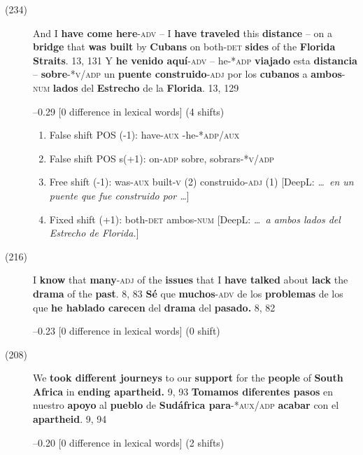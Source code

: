 \documentclass[output=paper]{langsci/langscibook}
\begin{document}
\begin{description}
  \item[(234)] And I \textbf{have come here}\textsc{-adv} -- I \textbf{have traveled} this \textbf{distance} -- on a \textbf{bridge} that \textbf{was built} by \textbf{Cubans} on both\textsc{-det} \textbf{sides} of the \textbf{Florida Straits}. 13, 131 \rightarrow Y \textbf{he venido aquí}\textsc{-adv} -- he\textsc{-*adp} \textbf{viajado} esta \textbf{distancia} -- \textbf{sobre}\textsc{-*v/adp} un \textbf{puente construido}\textsc{-adj} por los \textbf{cubanos} a \textbf{ambos}\textsc{-num} \textbf{lados} del \textbf{Estrecho} de la \textbf{Florida}. 13, 129

    --0.29 [0 difference in lexical words] (4 shifts)
    
    \begin{enumerate}
      \item False shift POS (-1): have\textsc{-aux} \rightarrow -he\textsc{-*adp/aux}
      \item False shift POS s(+1): on\textsc{-adp} \rightarrow sobre, sobrars\textsc{-*v/adp}
      \item Free shift (-1): was\textsc{-aux} built\textsc{-v} (2) \rightarrow construido\textsc{-adj} (1) [DeepL: \textit{\dots\ en un puente que fue construido por \dots}]
      \item Fixed shift (+1): both\textsc{-det} \rightarrow ambos\textsc{-num} [DeepL: \textit{\dots\ a ambos lados del Estrecho de Florida.}]
    \end{enumerate}

  \item[(216)] I \textbf{know} that \textbf{many}\textsc{-adj} of the \textbf{issues} that I \textbf{have talked} about \textbf{lack }the \textbf{drama} of the \textbf{past}. 8, 83 \rightarrow \textbf{Sé} que \textbf{muchos}\textsc{-adv} de los \textbf{problemas} de los que \textbf{he hablado carecen} del \textbf{drama} del \textbf{pasado.} 8, 82

    --0.23 [0 difference in lexical words] (0 shift)

  \item[(208)] We \textbf{took different journeys} to our \textbf{support} for the \textbf{people} of \textbf{South Africa} in \textbf{ending apartheid.} 9, 93 \rightarrow \textbf{Tomamos diferentes pasos} en nuestro \textbf{apoyo} al \textbf{pueblo} de \textbf{Sudáfrica para}\textsc{-*aux/adp} \textbf{acabar} con el \textbf{apartheid}. 9, 94

    --0.20 [0 difference in lexical words] (2 shifts)


\end{description}
\end{document}
